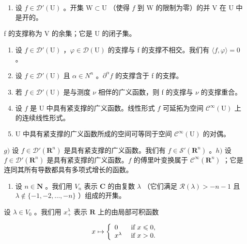 \begin{enumerate}
\def\labelenumi{\alph{enumi})}
\tightlist
\item
  设 \(f \in \mathcal{D}'(\mathrm{U})\) 。开集 \(\mathrm{W} \subset \mathrm{U}\) （使得 \(f\) 到 W 的限制为零）的并 V 在 U 中是开的。
\end{enumerate}

f 的支撑称为 V 的余集；它是 U 的闭子集。

\begin{enumerate}
\def\labelenumi{\alph{enumi})}
\setcounter{enumi}{1}
\item
  设 \(f \in \mathcal{D}'(\mathrm{U})\) ，\(\varphi \in \mathcal{D}(\mathrm{U})\) 的支撑与 f 的支撑不相交。我们有 \(\langle f, \varphi \rangle = 0\) 。
\item
  设 \(f \in \mathcal{D}'(\mathrm{U})\) 且 \(\alpha \in N^{n}\) 。\(\partial^{\alpha}f\) 的支撑含于 f 的支撑。
\item
  若 \(f \in \mathcal{D}'(\mathrm{U})\) 是与测度 \(\nu\) 相伴的广义函数，则 f 的支撑与 \(\nu\) 的支撑重合。
\item
  设 \(f\) 是 U 中具有紧支撑的广义函数。线性形式 \(f\) 可延拓为空间 \(\mathcal{C}^{\infty}(\mathrm{U})\) 上的连续线性形式。
\item
  U 中具有紧支撑的广义函数所成的空间可等同于空间 \(\mathcal{C}^{\infty}(\mathrm{U})\) 的对偶。
\end{enumerate}

\(g)\) 设 \(f \in \mathcal{D}'(\mathbf{R}^n)\) 是具有紧支撑的广义函数。我们有 \(f \in \mathcal{S}'(\mathbf{R}^n)\) 。\(h)\) 设 \(f \in \mathcal{D}'(\mathbf{R}^n)\) 是具有紧支撑的广义函数。\(f\) 的傅里叶变换属于 \(\mathcal{C}^\infty(\mathbf{R}^n)\) ；它是连同其所有导数都具有多项式增长的函数。

\begin{enumerate}
\def\labelenumi{\arabic{enumi})}
\setcounter{enumi}{19}
\tightlist
\item
  设 \(n \in \mathbf{N}\) 。我们用 \(V_n\) 表示 \(\mathbf{C}\) 的由复数 \(\lambda\) （它们满足 \(\mathcal{R}(\lambda) > -n - 1\) 且 \(\lambda \notin \{-1, -2, \ldots, -n\}\) ）组成的开集。
\end{enumerate}

设 \(\lambda\in V_{0}\) 。我们用 \(x_{+}^{\lambda}\) 表示 \(\mathbf{R}\) 上的由局部可积函数

\[
x \mapsto \left\{ \begin{array}{l l} 0 & \text { if } x \leqslant 0, \\ x ^ {\lambda} & \text { if } x > 0. \end{array} \right.
\]

